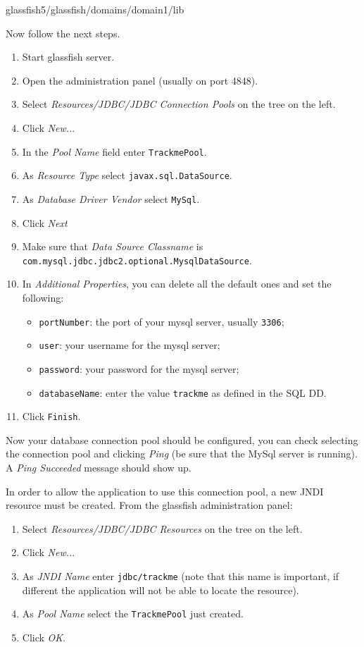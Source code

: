 \begin{center}
glassfish5/glassfish/domains/domain1/lib 
\end{center}
Now follow the next steps.
\begin{enumerate}
\item Start glassfish server.
\item Open the administration panel (usually on port 4848).
\item Select \textit{Resources/JDBC/JDBC Connection Pools} on the tree on the left.
\item Click \textit{New..}.
\item In the \textit{Pool Name} field enter \texttt{TrackmePool}.
\item As \textit{Resource Type} select \texttt{javax.sql.DataSource}.
\item As \textit{Database Driver Vendor} select \texttt{MySql}.
\item Click \textit{Next}
\item Make sure that \textit{Data Source Classname} is \texttt{com.mysql.jdbc.jdbc2.optional.MysqlDataSource}.
\item In \textit{Additional Properties}, you can delete all the default ones and set the following:
	\begin{itemize}
	\item \texttt{portNumber}: the port of your mysql server, usually \texttt{3306};
	\item \texttt{user}: your username for the mysql server;
	\item	\texttt{password}: your password for the mysql server;
	\item \texttt{databaseName}: enter the value \texttt{trackme} as defined in the SQL DD.
	\end{itemize}
\item Click \texttt{Finish}.
\end{enumerate}

Now your database connection pool should be configured, you can check selecting the connection pool and clicking \textit{Ping} (be sure that the MySql server is running).
A \textit{Ping Succeeded} message should show up.\vspace{1em}


\noindent
In order to allow the application to use this connection pool, a new JNDI resource must be created.
From the glassfish administration panel:

\begin{enumerate}
\item Select \textit{Resources/JDBC/JDBC Resources} on the tree on the left.
\item Click \textit{New..}.
\item As \textit{JNDI Name} enter \texttt{jdbc/trackme} (note that this name is important, if different the application will not be able to locate the resource).
\item As \textit{Pool Name} select the \texttt{TrackmePool} just created.
\item Click \textit{OK}.
\end{enumerate}


